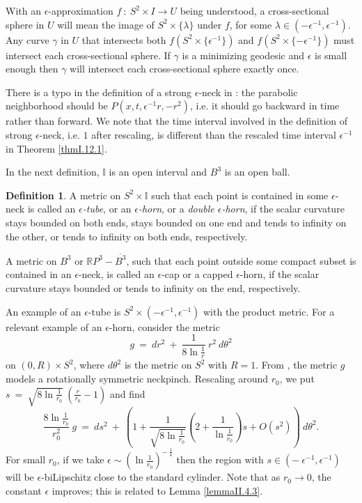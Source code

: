 \documentclass[12pt]{amsart}
\newcommand{\R}{{\mathbb R}}
\newcommand{\I}{{\mathbb I}}
\newcommand{\eps}{\epsilon}
\numberwithin{equation}{section}
\theoremstyle{plain}
\theoremstyle{definition}
\newtheorem{definition}[equation]{Definition}
\theoremstyle{remark}
\begin{document}
With an $\epsilon$-approximation 
$f \: : \: S^2 \times I \rightarrow U$ 
being understood, a cross-sectional sphere in $U$ will mean the
image of $S^2 \times \{ \lambda \}$ under $f$, for some
$\lambda \in (- \epsilon^{-1}, \epsilon^{-1})$. 
Any curve $\gamma$ in $U$ that intersects both 
$f(S^2 \times \{ \epsilon^{-1} \})$ and  $f(S^2 \times \{ -\epsilon^{-1} \})$ must
intersect each cross-sectional
sphere. If $\gamma$ is a minimizing  geodesic and $\epsilon$ is small
enough then $\gamma$ will intersect each cross-sectional sphere
exactly once.

There is a typo in the definition of a strong $\eps$-neck in \cite{Perelman2} :
the parabolic neighborhood should be $P(x,t,\eps^{-1}r,-r^2)$,
i.e. it should go backward in time rather than forward. We note that the
time interval involved in the
definition of strong $\eps$-neck, i.e. $1$ after rescaling, is different than the 
rescaled time interval $\epsilon^{-1}$ in Theorem \ref{thmI.12.1}.

In the next definition, $\I$ is an open interval and  $B^3$ is an open ball.  

\begin{definition}
A metric on 
$S^2 \times \I$ such that each point is contained in some $\epsilon$-neck
is called an {\em $\epsilon$-tube}, or an {\em $\epsilon$-horn}, or a {\em double
$\epsilon$-horn}, if the scalar curvature stays bounded on both ends,
stays bounded on one end and tends to infinity on the other, or
tends to infinity on both ends, respectively.

A metric on $B^3$ or $\R P^3 - \overline{B^3}$, such that each point
outside some compact subset is contained in an $\epsilon$-neck, is
called an $\epsilon$-cap or a capped $\epsilon$-horn, if the
scalar curvature stays bounded or tends to infinity on the end,
respectively.
\end{definition}

An example of an $\epsilon$-tube is $S^2 \times (- \epsilon^{-1}, \epsilon^{-1})$ with the
product metric. 
For a relevant example of an $\epsilon$-horn, consider the metric
\begin{equation}
g \: = \: dr^2 \: + \: \frac{1}{8\ln \frac{1}{r}} \: r^2 \: d\theta^2
\end{equation}
on $(0, R) \times S^2$, where $d\theta^2$ is the metric on $S^2$ with $R=1$.
From \cite{Angenent-Knopf}, the metric $g$ models a rotationally symmetric
neckpinch. Rescaling around $r_0$, we put
$s \: = \: \sqrt{8 \ln \frac{1}{r_0}} \: \left( \frac{r}{r_0} - 1 \right)$ and find
\begin{equation}
\frac{8 \ln \frac{1}{r_0} }{r_0^2} \: g \: = \:
ds^2 \: + \: \left( 1 + 
{ \frac{1}{\sqrt{8 \ln \frac{1}{r_0} }}  }
\left( 2 + 
\frac{1}{\ln \frac{1}{r_0}} 
\right) s + O(s^2) \right) \: d\theta^2.
\end{equation}
For small $r_0$, if we take
$\epsilon \sim \left( \ln \frac{1}{r_0} \right)^{- \: \frac14}$ then the region with 
$s \in \left( - \: \epsilon^{-1}, \epsilon^{-1} \right)$
will be $\epsilon$-biLipschitz close
to the standard cylinder. Note that as $r_0 \rightarrow 0$,
the constant $\epsilon$ improves; this is related to
Lemma \ref{lemmaII.4.3}.
\end{document}
